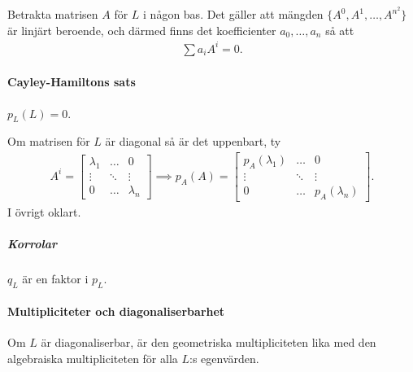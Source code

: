 \proof
Betrakta matrisen $A$ för $L$ i någon bas. Det gäller att mängden $\{A^{0}, A^{1}, \dots, A^{n^2}\}$ är linjärt beroende, och därmed finns det koefficienter $a_{0}, \dots, a_{n}$ så att
\begin{align*}
	\sum a_{i}A^{i} = 0.
\end{align*}

\paragraph{Cayley-Hamiltons sats}
$p_{L}(L) = 0$.

\proof
Om matrisen för $L$ är diagonal så är det uppenbart, ty
\begin{align*}
	A^{i} =
	\left[\begin{array}{ccc}
		\lambda_{1} & \dots  & 0 \\
		\vdots      & \ddots & \vdots \\
		0           & \dots  & \lambda_{n}
	\end{array}\right]
	\implies
	p_{A}(A) =
	\left[\begin{array}{ccc}
		p_{A}(\lambda_{1}) & \dots  & 0 \\
		\vdots             & \ddots & \vdots \\
		0                  & \dots  & p_{A}(\lambda_{n})
	\end{array}\right].
\end{align*}
I övrigt oklart.

\subparagraph{Korrolar}
$q_{L}$ är en faktor i $p_{L}$.

\paragraph{Multipliciteter och diagonaliserbarhet}
Om $L$ är diagonaliserbar, är den geometriska multipliciteten lika med den algebraiska multipliciteten för alla $L$:s egenvärden.